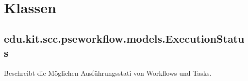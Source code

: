     \section{Klassen}
%    
%        
%            
%            
%	            
%                

		\subsection{edu.kit.scc.pseworkflow.models.ExecutionStatus}	
			Beschreibt die Möglichen Ausführungsstati von Workflows und Tasks.
			
